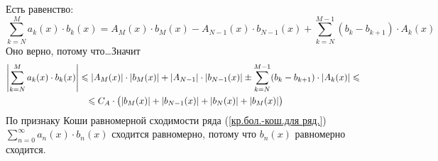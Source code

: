 \begin{prf} Есть равенство:
	\[\sum_{k = N}^{M} a_k(x) \cdot b_k(x) = A_M(x) \cdot b_M(x) - A_{N-1}(x) \cdot b_{N-1}(x) + \sum_{k = N}^{M - 1}(b_k - b_{k+1}) \cdot A_k(x)\]
	Оно верно, потому что\dots \quad Значит
	\begin{gather*}
	\left|\sum_{k = N}^{M} a_k(x) \cdot b_k(x)\right| \leqslant |A_M(x)|\cdot |b_M(x)| + |A_{N-1}|\cdot |b_{N-1}(x)| \pm \sum_{k = N}^{M-1} (b_k - b_{k+1}) \cdot |A_k(x)| \leqslant{} \\
 	{}\leqslant C_A \cdot \bigl(|b_M(x)| + |b_{N-1}(x)| + |b_N(x)| + |b_M(x)|\bigr)
	\end{gather*}
	По признаку Коши равномерной сходимости ряда (\ref{кр.бол.-кош.для ряд.}) $\sum\limits_{n = 0}^{\infty} a_n(x) \cdot b_n(x)$ сходится равномерно, потому что $b_n(x)$ равномерно сходится.
\end{prf}